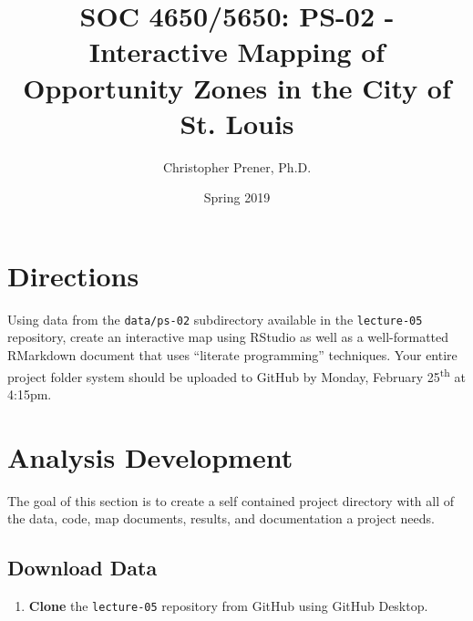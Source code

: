 \documentclass{tufte-handout}
\title{SOC 4650/5650: PS-02 - Interactive Mapping of Opportunity Zones in the City of St. Louis}
\author{Christopher Prener, Ph.D.}
\date{Spring 2019}
\begin{document}
\maketitle %

\vspace{5mm}
\section{Directions}
Using data from the \texttt{data/ps-02} subdirectory available in the \texttt{lecture-05} repository, create an interactive map using RStudio as well as a well-formatted RMarkdown document that uses ``literate programming'' techniques. Your entire project folder system should be uploaded to GitHub by Monday, February 25\textsuperscript{th} at 4:15pm.

\vspace{5mm}
\section{Analysis Development}
The goal of this section is to create a self contained project directory with all of the data, code, map documents, results, and documentation a project needs.

\vspace{3mm}
\subsection{Download Data}
\begin{enumerate}[label=\alph*.]
\item \textbf{Clone} the \texttt{lecture-05} repository from GitHub using GitHub Desktop.
\end{enumerate}

\vspace{3mm}
\end{document}
